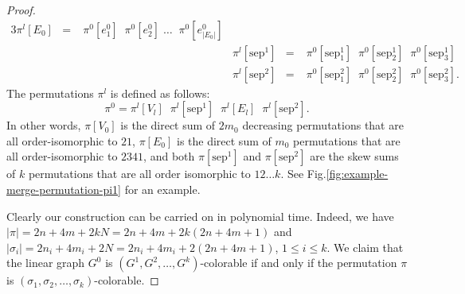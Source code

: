 \begin{proof}
\begin{alignat*}{3}
    \pi^l[E_0] &=&\; \pi^0[e^0_1] \;\; \pi^0[e^0_2] \; \dots \;\; \pi^0[e^0_{|E_0|}] \\
    &&\quad&
    \pi^l[\text{sep}^{1}] &=&\; \pi^0[\text{sep}^{1}_{1}] \;\; \pi^0[\text{sep}^{1}_{2}] \;\; \pi^0[\text{sep}^{1}_{3}] \\
    &&\quad&
    \pi^l[\text{sep}^{2}] &=&\; \pi^0[\text{sep}^{2}_{1}] \;\; \pi^0[\text{sep}^{2}_{2}] \;\; \pi^0[\text{sep}^{2}_{3}]\text{.}
  \end{alignat*}
  The permutations $\pi^l$ is defined as follows:
  $$
  \pi^0 = \pi^l[V_l] \;\; \pi^l[\text{sep}^{1}] \;\; \pi^l[E_l] \;\; \pi^l[\text{sep}^{2}]\text{.}
  $$
  In other words,
  $\pi[V_0]$ is the direct sum of $2m_0$ decreasing permutations
  that are all order-isomorphic to $21$,
  $\pi[E_0]$ is the direct sum of $m_0$ permutations that are all
  order-isomorphic to $2341$, and
  both $\pi[\text{sep}^{1}]$ and $\pi[\text{sep}^{2}]$ are the skew sums
  of $k$ permutations that are all order isomorphic to $12 \dots k$.
  See Fig.\ref{fig:example-merge-permutation-pi1} for an example.

  


  Clearly our construction can be carried on in polynomial time.
  Indeed, we have
  $|\pi| = 2n + 4m + 2kN = 2n + 4m + 2k(2n+4m+1)$
  and
  $|\sigma_i| = 2n_i + 4m_i + 2N = 2n_i + 4m_i + 2(2n+4m+1)$,
  $1 \leq i \leq k$.
  We claim that the linear graph $G^0$ is
  $(G^1, G^2, \dots, G^k)$-colorable
  if and only if the permutation
  $\pi$ is $(\sigma_1, \sigma_2, \dots, \sigma_k)$-colorable.


\end{proof}
